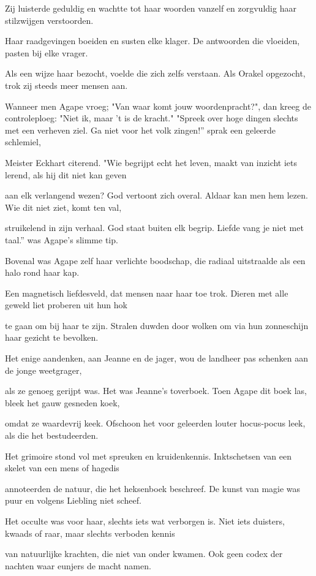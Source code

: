 Zij luisterde geduldig
en wachtte tot haar woorden
vanzelf en zorgvuldig
haar stilzwijgen verstoorden.

Haar raadgevingen boeiden
en susten elke klager.
De antwoorden die vloeiden,
pasten bij elke vrager.

Als een wijze haar bezocht,
voelde die zich zelfs verstaan.
Als Orakel opgezocht,
trok zij steeds meer mensen aan.

Wanneer men Agape vroeg;
"Van waar komt jouw woordenpracht?",
dan kreeg de controleploeg:
"Niet ik, maar 't is de kracht."
"Spreek over hoge dingen
slechts met een verheven ziel.
Ga niet voor het volk zingen!”
sprak een geleerde schlemiel,

Meister Eckhart citerend.
"Wie begrijpt echt het leven,
maakt van inzicht iets lerend,
als hij dit niet kan geven

aan elk verlangend wezen?
God vertoont zich overal.
Aldaar kan men hem lezen.
Wie dit niet ziet, komt ten val,

struikelend in zijn verhaal.
God staat buiten elk begrip.
Liefde vang je niet met taal.”
was Agape’s slimme tip.

Bovenal was Agape
zelf haar verlichte boodschap,
die radiaal uitstraalde
als een halo rond haar kap.

Een magnetisch liefdesveld,
dat mensen naar haar toe trok.
Dieren met alle geweld
liet proberen uit hun hok

te gaan om bij haar te zijn.
Stralen duwden door wolken
om via hun zonneschijn
haar gezicht te bevolken.

Het enige aandenken,
aan Jeanne en de jager,
wou de landheer pas schenken
aan de jonge weetgrager,

als ze genoeg gerijpt was.
Het was Jeanne’s toverboek.
Toen Agape dit boek las,
bleek het gauw gesneden koek,

omdat ze waardevrij keek.
Ofschoon het voor geleerden
louter hocus-pocus leek,
als die het bestudeerden.

Het grimoire stond vol met
spreuken en kruidenkennis.
Inktschetsen van een skelet
van een mens of hagedis

annoteerden de natuur,
die het heksenboek beschreef.
De kunst van magie was puur
en volgens Liebling niet scheef.

Het occulte was voor haar,
slechts iets wat verborgen is.
Niet iets duisters, kwaads of raar,
maar slechts verboden kennis

van natuurlijke krachten,
die niet van onder kwamen.
Ook geen codex der nachten
waar eunjers de macht namen.
